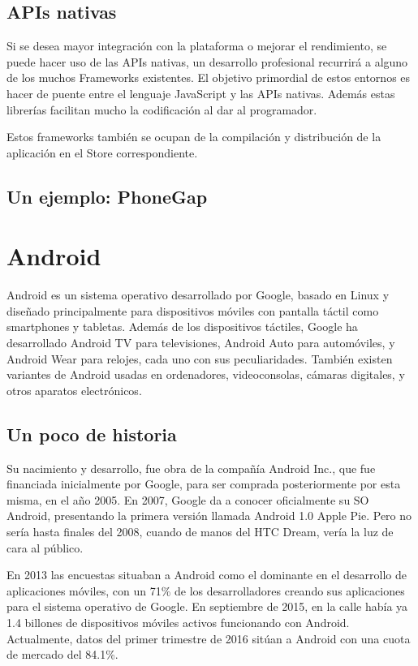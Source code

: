 \documentclass[
10pt, %
a4paper, %
oneside, %
headinclude,footinclude, %
BCOR5mm, %
]{scrartcl}
\begin{document}
\subsection{APIs nativas}
Si se desea mayor integración con la plataforma o mejorar el rendimiento, se puede hacer uso de las APIs nativas, un desarrollo profesional recurrirá a alguno de los muchos Frameworks existentes. El objetivo primordial de estos entornos es hacer de puente entre el lenguaje JavaScript y las APIs nativas. Además estas librerías facilitan mucho la codificación al dar al programador.

Estos frameworks también se ocupan de la compilación y distribución de la aplicación en el Store correspondiente.
\subsection{Un ejemplo: PhoneGap}

\section{Android}
Android es un sistema operativo desarrollado por Google, basado en Linux y diseñado principalmente para dispositivos móviles con pantalla táctil como smartphones y tabletas. Además de los dispositivos táctiles, Google ha desarrollado Android TV para televisiones, Android Auto para automóviles, y Android Wear para relojes, cada uno con sus peculiaridades. También existen variantes de Android usadas en ordenadores, videoconsolas, cámaras digitales, y otros aparatos electrónicos.

\subsection{Un poco de historia}
Su nacimiento y desarrollo, fue obra de la compañía Android Inc., que fue financiada inicialmente por Google, para ser comprada posteriormente por esta misma, en el año 2005. En 2007, Google da a conocer oficialmente su SO Android, presentando la primera versión llamada Android 1.0 Apple Pie. Pero no sería hasta finales del 2008, cuando de manos del HTC Dream, vería la luz de cara al público. 

En 2013 las encuestas situaban a Android como el dominante en el desarrollo de aplicaciones móviles, con un 71\% de los desarrolladores creando sus aplicaciones para el sistema operativo de Google. En septiembre de 2015, en la calle había ya 1.4 billones de dispositivos móviles activos funcionando con Android. Actualmente, datos del primer trimestre de 2016 sitúan a Android con una cuota de mercado del 84.1\%.
\end{document}
